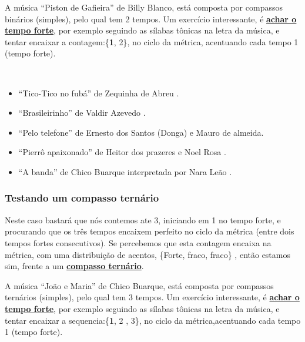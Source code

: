 \begin{example}
\label{ex:compassosimples3t}
A música ``Piston de Gafieira'' de Billy Blanco,
está composta por compassos binários (simples), pelo qual tem 2 tempos.
Um exercício interessante, é \hyperref[subsec:perceberTF1]{\textbf{achar o tempo forte}},
por exemplo seguindo as sílabas tônicas na letra da música,
e tentar encaixar a contagem:\{\textbf{1}, 2\}, no ciclo da métrica, acentuando cada tempo 1 (tempo forte). 
\end{example}

\begin{example}
~
\begin{itemize}
\item ``Tico-Tico no fubá'' de Zequinha de Abreu  \cite[pp. 6]{marcondes1998enciclopedia} \cite[pp. 39,91]{diniz2003almanaque}.
\item ``Brasileirinho'' de Valdir Azevedo  \cite[pp. 133]{perna2002samba}.
\item ``Pelo telefone'' de  Ernesto dos Santos (Donga) e Mauro de almeida.
\item ``Pierrô apaixonado'' de Heitor dos prazeres e Noel Rosa \cite[pp. 1070]{marcondes1977enciclopediav2} \cite[pp. 53]{diniz2008almanaque}.
\item ``A banda'' de Chico Buarque interpretada por Nara Leão \cite[pp. 90]{diniz2008almanaque} \cite{partituraabanda1}.
\end{itemize}
\end{example}


\subsubsection{Testando um compasso ternário}
Neste caso bastará que nós contemos ate 3, iniciando em 1 no tempo forte,
e procurando que os três tempos encaixem perfeito no ciclo da métrica (entre dois tempos fortes consecutivos).
Se percebemos que esta contagem encaixa na métrica,
com uma distribuição de acentos, \{Forte, fraco, fraco\} \cite[pp. 10]{wright1992social}, 
então estamos sim, frente a um  \hyperref[subsec:compassoternario]{\textbf{compasso ternário}}.

\begin{example}
\label{ex:compassosimples3t}
A música ``João e Maria'' de Chico Buarque,
está composta por compassos ternários (simples), pelo qual tem 3 tempos.
Um exercício interessante, é \hyperref[subsec:perceberTF1]{\textbf{achar o tempo forte}},
por exemplo seguindo as sílabas tônicas na letra da música,
e tentar encaixar a sequencia:\{\textbf{1}, 2 , 3\}, no ciclo da métrica,acentuando cada tempo 1 (tempo forte). 
\end{example}

